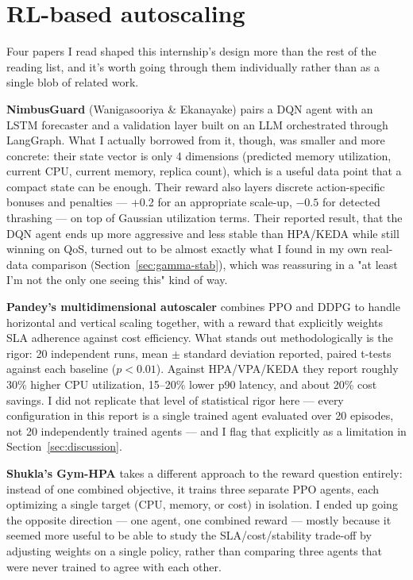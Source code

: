 \documentclass{rapportINPTCLOUD}
\begin{document}
\section{RL-based autoscaling}
\label{sec:sota-rl}

Four papers I read shaped this internship's design more than the rest of the reading list, and it's worth going through them individually rather than as a single blob of related work.

\textbf{NimbusGuard} (Wanigasooriya \& Ekanayake) \cite{nimbusguard} pairs a DQN agent with an LSTM forecaster and a validation layer built on an LLM orchestrated through LangGraph. What I actually borrowed from it, though, was smaller and more concrete: their state vector is only 4 dimensions (predicted memory utilization, current CPU, current memory, replica count), which is a useful data point that a compact state can be enough. Their reward also layers discrete action-specific bonuses and penalties — +0.2 for an appropriate scale-up, $-0.5$ for detected thrashing — on top of Gaussian utilization terms. Their reported result, that the DQN agent ends up more aggressive and less stable than HPA/KEDA while still winning on QoS, turned out to be almost exactly what I found in my own real-data comparison (Section~\ref{sec:gamma-stab}), which was reassuring in a "at least I'm not the only one seeing this" kind of way.

\textbf{Pandey's multidimensional autoscaler} \cite{pandey} combines PPO and DDPG to handle horizontal and vertical scaling together, with a reward that explicitly weights SLA adherence against cost efficiency. What stands out methodologically is the rigor: 20 independent runs, mean $\pm$ standard deviation reported, paired t-tests against each baseline ($p<0.01$). Against HPA/VPA/KEDA they report roughly 30\% higher CPU utilization, 15--20\% lower p90 latency, and about 20\% cost savings. I did not replicate that level of statistical rigor here — every configuration in this report is a single trained agent evaluated over 20 episodes, not 20 independently trained agents — and I flag that explicitly as a limitation in Section~\ref{sec:discussion}.

\textbf{Shukla's Gym-HPA} \cite{shukla} takes a different approach to the reward question entirely: instead of one combined objective, it trains three separate PPO agents, each optimizing a single target (CPU, memory, or cost) in isolation. I ended up going the opposite direction — one agent, one combined reward — mostly because it seemed more useful to be able to study the SLA/cost/stability trade-off by adjusting weights on a single policy, rather than comparing three agents that were never trained to agree with each other.
\end{document}
